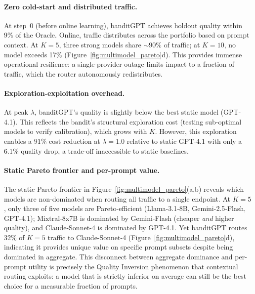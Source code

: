\paragraph{Zero cold-start and distributed traffic.}
At step~0 (before online learning), banditGPT achieves holdout quality within 9\% of the Oracle. Online, traffic distributes across the portfolio based on prompt context. At $K{=}5$, three strong models share ${\sim}90\%$ of traffic; at $K{=}10$, no model exceeds 17\% (Figure~\ref{fig:multimodel_pareto}d). This provides immense operational resilience: a single-provider outage limits impact to a fraction of traffic, which the router autonomously redistributes.

\paragraph{Exploration-exploitation overhead.}
At peak $\lambda$, banditGPT's quality is slightly below the best static model (GPT-4.1). This reflects the bandit's structural exploration cost (testing sub-optimal models to verify calibration), which grows with $K$. However, this exploration enables a $91\%$ cost reduction at $\lambda{=}1.0$ relative to static GPT-4.1 with only a 6.1\% quality drop, a trade-off inaccessible to static baselines.

\paragraph{Static Pareto frontier and per-prompt value.}
The static Pareto frontier in Figure~\ref{fig:multimodel_pareto}(a,b) reveals which models are non-dominated when routing all traffic to a single endpoint. At $K{=}5$, only three of five models are Pareto-efficient (Llama-3.1-8B, Gemini-2.5-Flash, GPT-4.1); Mixtral-8x7B is dominated by Gemini-Flash (cheaper \emph{and} higher quality), and Claude-Sonnet-4 is dominated by GPT-4.1. Yet banditGPT routes 32\% of $K{=}5$ traffic to Claude-Sonnet-4 (Figure~\ref{fig:multimodel_pareto}d), indicating it provides unique value on specific prompt subsets despite being dominated in aggregate. This disconnect between aggregate dominance and per-prompt utility is precisely the Quality Inversion phenomenon that contextual routing exploits: a model that is strictly inferior on average can still be the best choice for a measurable fraction of prompts.
